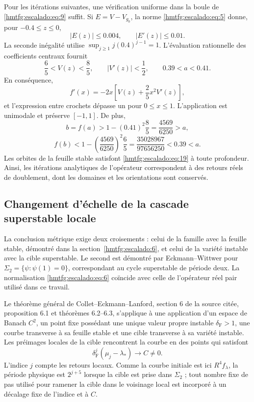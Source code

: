 Pour les itérations suivantes, une vérification uniforme dans la boule de \eqref{hmtfg:escalado:eq:9} suffit. Si \(E=V-V_{g_0}\), la norme \eqref{hmtfg:escalado:eq:5} donne, pour \(-0.4\le z\le0\),
\[
|E(z)|\le0.004,\qquad |E'(z)|\le0.01.
\]
La seconde inégalité utilise \(\sup_{j\ge1}j(0.4)^{j-1}=1\). L’évaluation rationnelle des coefficients centraux fournit
\begin{equation}
\frac65<V(z)<\frac85,\qquad |V'(z)|<\frac12,
\qquad 0.39<a<0.41.
\label{hmtfg:escalado:eq:20}
\end{equation}
En conséquence,
\[
f'(x)=-2x\left[V(z)+\frac25x^2V'(z)\right],
\]
et l’expression entre crochets dépasse un pour \(0\le x\le1\). L’application est unimodale et préserve \([-1,1]\). De plus,
\[
b=f(a)>1-(0.41)^2\frac85=\frac{4569}{6250}>a,
\]
\begin{equation}
f(b)<1-\left(\frac{4569}{6250}\right)^2\frac65
=\frac{35028967}{97656250}<0.39<a.
\label{hmtfg:escalado:eq:21}
\end{equation}
Les orbites de la feuille stable satisfont \eqref{hmtfg:escalado:eq:19} à toute profondeur. Ainsi, les itérations analytiques de l’opérateur correspondent à des retours réels de doublement, dont les domaines et les orientations sont conservés.


\subsection{Changement d’échelle de la cascade superstable locale}
\label{hmtfg:escalado:8}

La conclusion métrique exige deux croisements : celui de la famille avec la feuille stable, démontré dans la section~\ref{hmtfg:escalado:6}, et celui de la variété instable avec la cible superstable. Le second est démontré par Eckmann–Wittwer pour
\(\Sigma_2=\{\psi:\psi(1)=0\}\), correspondant au cycle superstable de période deux. La normalisation \eqref{hmtfg:escalado:eq:6} coïncide avec celle de l’opérateur réel pair utilisé dans ce travail.

Le théorème général de Collet–Eckmann–Lanford, section 6 de la source citée, proposition 6.1 et théorèmes 6.2–6.3, s’applique à une application d’un espace de Banach \(C^2\), un point fixe possédant une unique valeur propre instable \(\delta_{\mathrm F}>1\), une courbe transverse à sa feuille stable et une cible transverse à sa variété instable. Les préimages locales de la cible rencontrent la courbe en des points qui satisfont
\begin{equation}
\delta_{\mathrm F}^j(\mu_j-\lambda_*)\longrightarrow C\ne0.
\label{hmtfg:escalado:eq:22}
\end{equation}
L’indice \(j\) compte les retours locaux. Comme la courbe initiale est ici \(R^4f_\lambda\), la période physique est \(2^{j+5}\) lorsque la cible est prise dans \(\Sigma_2\) ; tout nombre fixe de pas utilisé pour ramener la cible dans le voisinage local est incorporé à un décalage fixe de l’indice et à \(C\).

